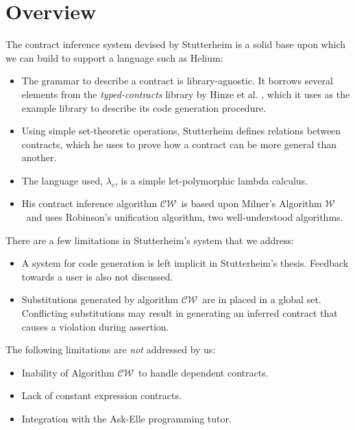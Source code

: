 \documentclass[10pt]{report}
\newcommand{\W}{$\mathcal{W}$}
\newcommand{\CW}{$\mathcal{CW}$}
\begin{document}
\chapter{Overview}
\label{chapter-overview}

The contract inference system devised by Stutterheim is a solid base upon which we can build to support a language such as Helium:

\begin{itemize}
	\item The grammar to describe a contract is library-agnostic. It borrows several elements from the \textit{typed-contracts} library by Hinze et al. \cite{Hinze06typedcontracts}, which it uses as the example library to describe its code generation procedure.
	\item Using simple set-theoretic operations, Stutterheim defines relations between contracts, which he uses to prove how a contract can be more general than another.
	\item The language used, $\lambda_c$, is a simple let-polymorphic lambda calculus.
	\item His contract inference algorithm \CW ~is based upon Milner's Algorithm \W ~and uses Robinson's unification algorithm, two well-understood algorithms.
\end{itemize}

There are a few limitations in Stutterheim's system that we address:

\begin{itemize}
	\item A system for code generation is left implicit in Stutterheim's thesis. Feedback towards a user is also not discussed.
	\item Substitutions generated by algorithm \CW ~are in placed in a global set. Conflicting substitutions may result in generating an inferred contract that causes a violation during assertion.
\end{itemize}

The following limitations are \textit{not} addressed by us:

\begin{itemize}
	\item Inability of Algorithm \CW ~to handle dependent contracts.
	\item Lack of constant expression contracts.
	\item Integration with the Ask-Elle programming tutor.
\end{itemize}
\end{document}
